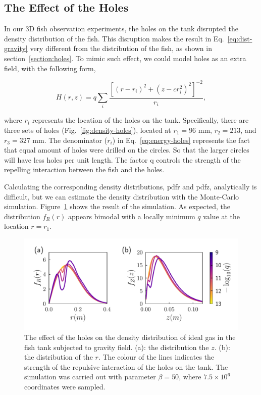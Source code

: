 \documentclass[11pt,twoside]{report}
\begin{document}
\subsection{The Effect of the Holes}
\label{section:sim-mc-holes}

In our 3D fish observation experiments, the holes on the tank disrupted the density distribution of the fish. This disruption makes the result in Eq.~\ref{eq:dist-gravity} very different from the distribution of the fish, as shown in section~\ref{section:holes}. To mimic such effect, we could model holes as an extra field, with the following form,

\begin{equation}
	H(r, z) = q
		\sum_i{\frac{
		\left[
			(r - r_i)^2 + (z - c r_i^2)^2
		\right]^{-2}
		}{r_i}},
\label{eq:energy-holes}
\end{equation}

\noindent where $r_i$ represents the location of the holes on the tank. Specifically, there are three sets of holes (Fig.~\ref{fig:density-holes}), located at $r_1=96$ mm, $r_2=213$, and $r_3=327$ mm. The denominator ($r_i$) in Eq.~\ref{eq:energy-holes} represents the fact that equal amount of holes were drilled on the circles. So that the larger circles will have less holes per unit length. The factor \gls{q} controls the strength of the repelling interaction between the fish and the holes.

Calculating the corresponding density distributions, \gls{pdfr} and \gls{pdfz}, analytically is difficult, but we can estimate the density distribution with the Monte-Carlo simulation. Figure~\ref{fig:dist-holes} shows the result of the simulation. As expected, the distribution $f_R(r)$ appears bimodal with a locally minimum $q$ value at the location $r = r_1$.

\begin{figure}
  \includegraphics[width=\linewidth]{density-holes}
  \caption[The effect of the holes on the density distribution]{
  The effect of the holes on the density distribution of ideal gas in the fish tank subjected to gravity field.
  (a): the distribution the $z$.
  (b): the distribution of the $r$.
  The colour of the lines indicates the strength of the repulsive interaction of the holes on the tank. The simulation was carried out with parameter $\beta=50$, where $7.5 \times 10^{6}$ coordinates were sampled.
  }
  \label{fig:dist-holes}
\end{figure}
\end{document}
